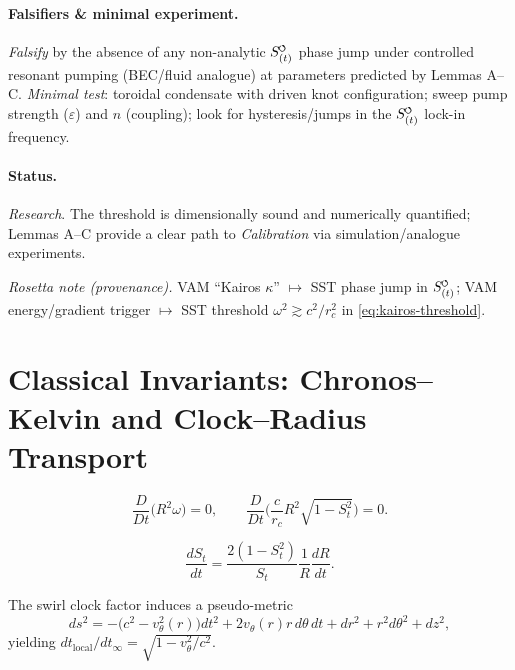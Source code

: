 \documentclass[reprint,aps,onecolumn,nofootinbib]{revtex4-2}
\newcommand{\swirlarrow}{%
    \mathchoice{\mkern-2mu\scriptstyle\boldsymbol{\circlearrowleft}}%
    {\mkern-2mu\scriptstyle\boldsymbol{\circlearrowleft}}%
    {\mkern-2mu\scriptscriptstyle\boldsymbol{\circlearrowleft}}%
    {\mkern-2mu\scriptscriptstyle\boldsymbol{\circlearrowleft}}%
}
\newcommand{\SwirlClock}{S_{(t)}^{\swirlarrow}}
\newcommand{\rc}{r_c}                                    %
\providecommand{\rc}{r_c}
\begin{document}
        \paragraph{Falsifiers \& minimal experiment.}
            \emph{Falsify} by the absence of any non-analytic $\SwirlClock$ phase jump under controlled resonant pumping
            (BEC/fluid analogue) at parameters predicted by Lemmas A–C.
            \emph{Minimal test}: toroidal condensate with driven knot configuration; sweep pump strength ($\varepsilon$) and $n$ (coupling);
            look for hysteresis/jumps in the $\SwirlClock$ lock-in frequency.

        \paragraph{Status.}
            \emph{Research}. The threshold is dimensionally sound and numerically quantified;
            Lemmas A–C provide a clear path to \emph{Calibration} via simulation/analogue experiments.

            \vspace{0.5em}
            \noindent\emph{Rosetta note (provenance).} VAM “Kairos $\kappa$” $\mapsto$ SST phase jump in $\SwirlClock$;
            VAM energy/gradient trigger $\mapsto$ SST threshold $\omega^2\!\gtrsim\!c^2/\rc^2$ in \eqref{eq:kairos-threshold}.
            \vspace{0.75em}

    \section{Classical Invariants: Chronos--Kelvin and Clock--Radius Transport}\label{canon58:classical-invariants}
    \begin{tcolorbox}[title=Axiom: Chronos--Kelvin Invariant]
    \label{canon58:CK}
    \[
        \frac{D}{Dt}\big(R^2\omega\big)=0,
        \qquad
        \frac{D}{Dt}\Big(\frac{c}{r_c}R^2\sqrt{1-S_t^2}\Big)=0.
    \]
    \end{tcolorbox}
    \begin{tcolorbox}[title=Corollary: Clock--Radius Transport]
    \label{canon58:clock-transport}
    \[
        \frac{dS_t}{dt} = \frac{2(1-S_t^2)}{S_t}\frac{1}{R}\frac{dR}{dt}.
    \]
    \end{tcolorbox}
    \begin{tcolorbox}[title=Remark (Pseudo-metric)]
    The swirl clock factor induces a pseudo-metric
    \[
        ds^2 = -\big(c^2 - v_\theta^2(r)\big)dt^2 + 2v_\theta(r)r\,d\theta\,dt + dr^2 + r^2 d\theta^2 + dz^2,
    \]
    yielding $dt_{\text{local}}/dt_\infty = \sqrt{1 - v_\theta^2/c^2}$. %
    \end{tcolorbox}
\end{document}
